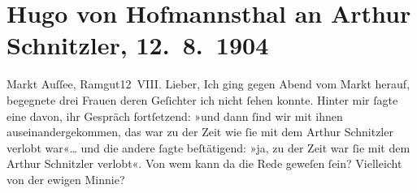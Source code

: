 

         
         \renewcommand{\erwaehntePersonen}{Personen: Hermine von Schaffgotsch, Franziska Schlesinger, Louise Schnitzler, Christopher St. John, Robert Gilbert Vansittart}
         \renewcommand{\erwaehnteInstitutionen}{Institutionen: Eton College}
         \renewcommand{\erwaehnteOrte}{Orte: Bad Aussee, Bad Ischl, Botschaft von Großbritannien in Paris, England, Ramgut, Villa Franckenstein, Wien, Wolfgangsee}
         \renewcommand{\erwaehnteWerke}{Werke: Anatol, Das Vermächtnis. Schauspiel in drei Akten, Der Schleier der Beatrice. Schauspiel in fünf Akten, Sterben. Novelle}
               \section[Hugo von Hofmannsthal an Arthur Schnitzler, 12. 8. 1904]{ Hugo von Hofmannsthal an Arthur Schnitzler, 12. 8. 1904}\nopagebreak{}\rehead{ }\begin{ledgroupsized}[t]{13cm}\normalsize\beginnumbering \toendnotes[C]{\smallbreak\pagebreak[2]} 
\toendnotes[C]{\smallbreak}\pstart
           \raggedleft{}{\pb}Markt Auſſee, Ramgut12 VIII.\pend
           \pstart{}Lieber,\pend\pstart
           Ich ging gegen Abend vom Markt herauf, begegnete
               drei Frauen deren Geſichter ich nicht ſehen konnte. Hinter mir ſagte eine davon, ihr
               Gespräch fortſetzend: »und dann ſind wir mit ihnen auseinandergekommen, das war zu
               der Zeit wie ſie mit dem Arthur Schnitzler verlobt war«{\dots}
               und die andere ſagte beſtätigend: »ja, zu der Zeit war ſie mit {\pb}dem Arthur Schnitzler verlobt«.
               Von wem kann da die Rede geweſen ſein? Vielleicht von der ewigen Minnie?\pend

\end{ledgroupsized}
